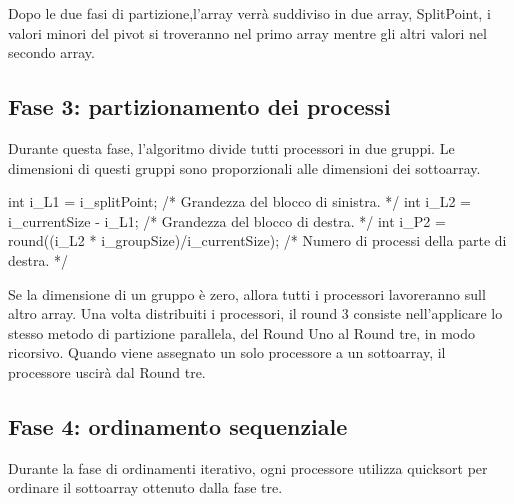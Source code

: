 Dopo le due fasi di partizione,l'array verrà suddiviso in due array, SplitPoint, i valori minori del pivot si troveranno nel primo array mentre gli altri valori nel secondo array.


\subsection{Fase 3: partizionamento dei processi} \label{subsect_Phase3}

Durante questa fase, l'algoritmo divide tutti processori in due gruppi.
Le dimensioni di questi gruppi sono proporzionali alle dimensioni dei sottoarray.

  int i\_L1 = i\_splitPoint; /* Grandezza del blocco di sinistra. */
  int i\_L2 = i\_currentSize - i\_L1; /* Grandezza del blocco di destra. */
  int i\_P2 = round((i\_L2 * i\_groupSize)/i\_currentSize); /* Numero di processi della parte di destra. */
    		

Se la dimensione di un gruppo è zero, allora tutti i processori lavoreranno sull altro array.
Una volta distribuiti i processori, il round 3 consiste nell'applicare lo stesso metodo di partizione parallela, del Round Uno al Round tre, in modo ricorsivo.
Quando viene assegnato un solo processore a un sottoarray, il processore uscirà dal Round tre.


\subsection{Fase 4: ordinamento sequenziale} \label{subsect_Phase4}

Durante la fase di ordinamenti iterativo, ogni processore utilizza quicksort per ordinare il sottoarray ottenuto dalla fase tre. 

